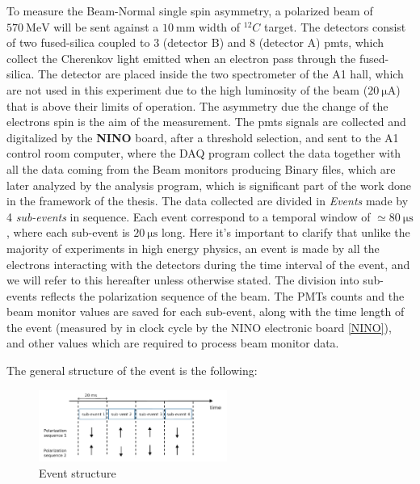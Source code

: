 To measure the Beam-Normal single spin asymmetry, a polarized beam of $ \SI{570}{\mega \electronvolt}$ will be sent against a $\SI{10}{\milli \meter}$ width of $^{12}C$ target. The detectors consist of two fused-silica coupled to 3 (detector B) and 8 (detector A) pmts, which collect the Cherenkov light emitted when an electron pass through the fused-silica. 
The detector are placed inside the two spectrometer of the A1 hall, which are not used in this experiment due to the high luminosity of the beam ($ \SI{20}{\micro \ampere}$) that is above their limits of operation. 
The asymmetry due the change of the electrons spin is the aim of the measurement. The pmts signals are collected and digitalized by the \textbf{NINO} board, after a threshold selection, and sent to the A1 control room computer, where the DAQ program collect the data together with all the data coming from the Beam monitors producing Binary files, which are later analyzed by the analysis program, which is significant part of the work done in the framework of the thesis. 
The data collected are divided in \textit{Events} made by 4 \textit{sub-events} in sequence. Each event correspond to a temporal window of $\simeq \SI{80}{\micro \second}$, where each sub-event is $\SI{20}{\micro \second}$ long. Here it's important to clarify that unlike the majority of experiments in high energy physics, an event is made by all the electrons interacting with the detectors during the time interval of the event, and we will refer to this hereafter unless otherwise stated. The division into sub-events reflects the polarization sequence of the beam. The PMTs counts and the beam monitor values are saved for each sub-event, along with the time length of the event (measured by in clock cycle by the NINO electronic board \ref{NINO}), and other values which are required to process beam monitor data.

The general structure of the event is the following: 

\begin{figure}[hbtp]
\centering
\includegraphics[width = 0.55\textwidth]{ExperimentalSetup/EventStructure.pdf}
\caption{Event structure}
\end{figure}

